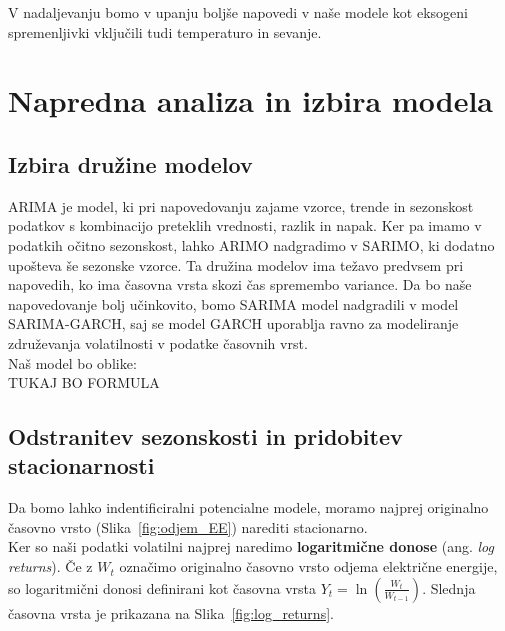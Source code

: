 \documentclass[a4paper, 11pt]{article}
\begin{document}
\noindent V nadaljevanju bomo v upanju boljše napovedi v naše modele kot 
eksogeni spremenljivki vključili tudi temperaturo in sevanje. 




\section{Napredna analiza in izbira modela}

\subsection{Izbira družine modelov}

ARIMA je model, ki pri napovedovanju zajame vzorce, trende in sezonskost podatkov s kombinacijo preteklih 
vrednosti, razlik in napak. Ker pa imamo v podatkih očitno sezonskost, lahko ARIMO nadgradimo v SARIMO, ki dodatno
upošteva še sezonske vzorce. Ta družina modelov ima težavo predvsem pri napovedih, ko ima časovna vrsta 
skozi čas spremembo variance. Da bo naše napovedovanje bolj učinkovito, bomo SARIMA model nadgradili v 
model SARIMA-GARCH, saj se model GARCH uporablja ravno za modeliranje združevanja volatilnosti 
v podatke časovnih vrst.~\cite{ArimaGarch} \\

\noindent Naš model bo oblike: \\

TUKAJ BO FORMULA 


\subsection{Odstranitev sezonskosti in pridobitev stacionarnosti}

Da bomo lahko indentificiralni potencialne modele, moramo najprej originalno časovno vrsto (Slika~\ref{fig:odjem_EE})
narediti stacionarno. \\

\noindent Ker so naši podatki volatilni najprej naredimo \textbf{logaritmične donose} 
(ang. \emph{log returns}). Če z $W_t$ označimo originalno časovno vrsto odjema električne energije, so logaritmični donosi
definirani kot časovna vrsta $ Y_t = \ln \left( \frac{W_t}{W_{t-1}} \right) $. Slednja časovna vrsta je prikazana na
Slika~\ref{fig:log_returns}.
\end{document}
